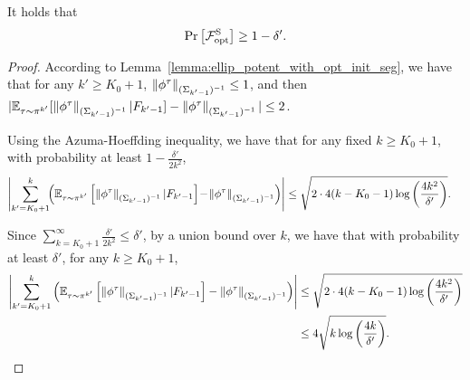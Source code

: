 \begin{lemma} 
	It holds that
	\begin{align*}
		\Pr \left[  \mathcal{F}^{\textup{S}}_{\textup{opt}}  \right] \geq 1-\delta' .
	\end{align*}
\end{lemma}
\begin{proof}
	According to Lemma~\ref{lemma:ellip_potent_with_opt_init_seg}, we have that for any $k'\geq K_0+1$, $\left\|  \phi^{\tau} \right\|_{(\Sigma_{k'-1})^{-1}} \leq 1$, and then $|\mathbb{E}_{\tau \sim \pi^{k'}} [\left\|  \phi^{\tau} \right\|_{(\Sigma_{k'-1})^{-1}} | F_{k'-1}] - \left\|  \phi^{\tau} \right\|_{(\Sigma_{k'-1})^{-1}}| \leq 2$. 
	
	
	Using the Azuma-Hoeffding inequality, we have that for any fixed $k \geq K_0+1$, with probability at least $1-\frac{\delta'}{2k^2}$,
	\begin{align*}
		\left| \sum_{k'=K_0+1}^{k} \!\! \left(  \mathbb{E}_{\tau \sim \pi^{k'}}\left[  \left\|  \phi^{\tau} \right\|_{(\Sigma_{k'-1})^{-1}} | F_{k'-1} \right] \!-\! \left\|  \phi^{\tau} \right\|_{(\Sigma_{k'-1})^{-1}}  \right)  \right| &\leq \sqrt{ 2 \cdot 4 (k-K_0-1) \log\left( \frac{4k^2}{\delta'} \right) } .
	\end{align*}
	
	Since $\sum_{k=K_0+1}^{\infty} \frac{\delta'}{2k^2} \leq \delta'$, by a union bound over $k$, we have that with probability at least $\delta'$, for any $k\geq K_0+1$,
	\begin{align*}
		\left| \sum_{k'=K_0+1}^{k} \left(  \mathbb{E}_{\tau \sim \pi^{k'}}\left[  \left\|  \phi^{\tau} \right\|_{(\Sigma_{k'-1})^{-1}} | F_{k'-1} \right] - \left\|  \phi^{\tau} \right\|_{(\Sigma_{k'-1})^{-1}}  \right)  \right| &\leq \sqrt{ 2 \cdot 4 (k-K_0-1) \log\left( \frac{4k^2}{\delta'} \right) } 
		\\
		&\leq 4 \sqrt{ k \log\left( \frac{4k}{\delta'} \right) } .
	\end{align*}
\end{proof}


